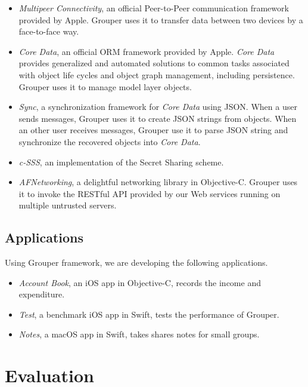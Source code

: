 \documentclass[twocolumn,10pt]{article}
\begin{document}
\begin{itemize}
	\setlength{\itemsep}{1pt}
	\setlength{\parskip}{0pt}
	\setlength{\parsep}{0pt}
	\item 
	\emph{Multipeer Connectivity}\cite{mc},  an official Peer-to-Peer communication framework provided by Apple. 
	Grouper uses it to transfer data between two devices by a face-to-face way.
	\item 
	\emph{Core Data}\cite{coredata}, an official ORM framework provided by Apple.
	\emph{Core Data} provides generalized and automated solutions to common tasks associated with object life cycles and object graph management, including persistence. 
	Grouper uses it to manage model layer objects. 
	\item 
	\emph{Sync}\cite{sync}, a synchronization framework for \emph{Core Data} using JSON. 
	When a user sends messages, Grouper uses it to create JSON strings from objects. 
	When an other user receives messages, Grouper use it to parse JSON string and synchronize the recovered objects into \emph{Core Data}.
	\item 
	\emph{c-SSS}\cite{c-sss}, an implementation of the Secret Sharing scheme.
	\item 
	\emph{AFNetworking}\cite{afnetworking}, a delightful networking library in Objective-C. 
	Grouper uses it to invoke the RESTful API provided by our Web services running on multiple untrusted servers. 
\end{itemize}

\subsection{Applications}

Using Grouper framework, we are developing the following applications. 

\begin{itemize}
	\setlength{\itemsep}{1pt}
	\setlength{\parskip}{0pt}
	\setlength{\parsep}{0pt}
	\item \emph{Account Book}, an iOS app in Objective-C, records the income and expenditure.
	\item \emph{Test}, a benchmark iOS app in Swift, tests the performance of Grouper.
	\item \emph{Notes}, a macOS app in Swift, takes shares notes for small groups.
\end{itemize}

\section{Evaluation}
\end{document}
